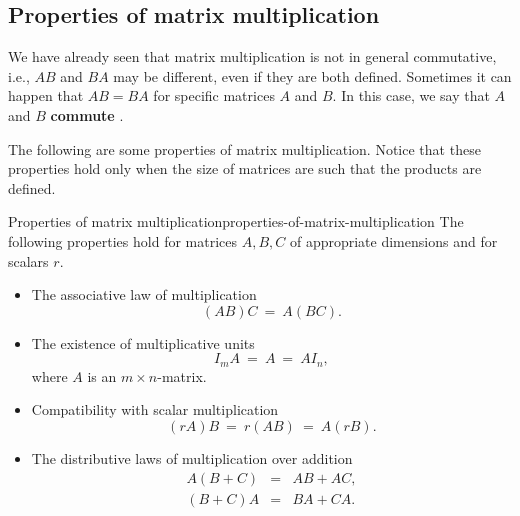 \subsection{Properties of matrix multiplication}

We have already seen that matrix multiplication is not in general
commutative, i.e., $AB$ and $BA$ may be different, even if they are
both defined. Sometimes it can happen that $AB=BA$ for specific
matrices $A$ and $B$. In this case, we say that $A$ and $B$
\textbf{commute}%
.

The following are some properties of matrix multiplication.  Notice
that these properties hold only when the size of matrices are such
that the products are defined.

\begin{theorem}{Properties of matrix multiplication}{properties-of-matrix-multiplication}
  The following properties hold%
   for matrices $A,B,C$
  of appropriate dimensions and for scalars $r$.
  \begin{itemize}
  \item The associative law of multiplication
    \begin{equation*}
      (AB)C ~=~ A(BC).
    \end{equation*}
  \item The existence of multiplicative units
    \begin{equation*}
      I_mA ~=~ A ~=~ AI_n,
    \end{equation*}
    where $A$ is an $m\times n$-matrix.
  \item Compatibility with scalar multiplication
    \begin{equation*}
      (rA)B ~=~ r(AB) ~=~ A(rB).
    \end{equation*}
  \item The distributive laws of multiplication over addition
    \begin{eqnarray*}
      A(B+C) &=& AB + AC, \\
      (B+C)A &=& BA + CA.
    \end{eqnarray*}
  \end{itemize}
\end{theorem}

